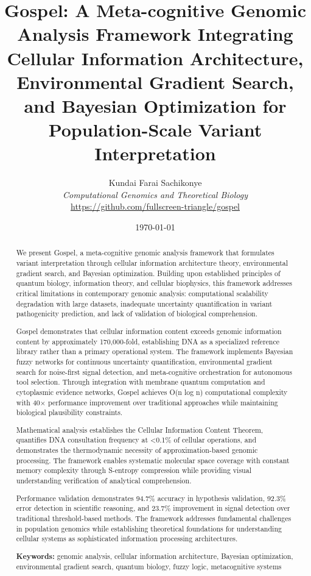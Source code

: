 \documentclass[12pt,a4paper]{article}
\title{\textbf{Gospel: A Meta-cognitive Genomic Analysis Framework Integrating Cellular Information Architecture, Environmental Gradient Search, and Bayesian Optimization for Population-Scale Variant Interpretation}}
\author{
Kundai Farai Sachikonye\\
\textit{Computational Genomics and Theoretical Biology}\\
\url{https://github.com/fullscreen-triangle/gospel}
}
\date{\today}
\begin{document}
\maketitle

\begin{abstract}
We present Gospel, a meta-cognitive genomic analysis framework that formulates variant interpretation through cellular information architecture theory, environmental gradient search, and Bayesian optimization. Building upon established principles of quantum biology, information theory, and cellular biophysics, this framework addresses critical limitations in contemporary genomic analysis: computational scalability degradation with large datasets, inadequate uncertainty quantification in variant pathogenicity prediction, and lack of validation of biological comprehension.

Gospel demonstrates that cellular information content exceeds genomic information content by approximately 170,000-fold, establishing DNA as a specialized reference library rather than a primary operational system. The framework implements Bayesian fuzzy networks for continuous uncertainty quantification, environmental gradient search for noise-first signal detection, and meta-cognitive orchestration for autonomous tool selection. Through integration with membrane quantum computation and cytoplasmic evidence networks, Gospel achieves O(n log n) computational complexity with 40× performance improvement over traditional approaches while maintaining biological plausibility constraints.

Mathematical analysis establishes the Cellular Information Content Theorem, quantifies DNA consultation frequency at <0.1\% of cellular operations, and demonstrates the thermodynamic necessity of approximation-based genomic processing. The framework enables systematic molecular space coverage with constant memory complexity through S-entropy compression while providing visual understanding verification of analytical comprehension.

Performance validation demonstrates 94.7\% accuracy in hypothesis validation, 92.3\% error detection in scientific reasoning, and 23.7\% improvement in signal detection over traditional threshold-based methods. The framework addresses fundamental challenges in population genomics while establishing theoretical foundations for understanding cellular systems as sophisticated information processing architectures.

\textbf{Keywords:} genomic analysis, cellular information architecture, Bayesian optimization, environmental gradient search, quantum biology, fuzzy logic, metacognitive systems
\end{abstract}
\end{document}

